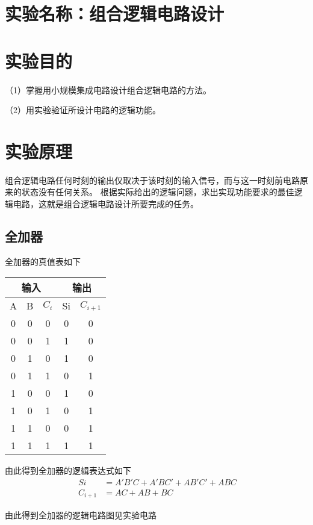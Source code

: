 \documentclass{article}
\begin{document}
	\section{ 实验名称：组合逻辑电路设计}
    \section{ 实验目的}
     （1）掌握用小规模集成电路设计组合逻辑电路的方法。\par 
               （2）用实验验证所设计电路的逻辑功能。\par 

   	\section{ 实验原理}
     组合逻辑电路任何时刻的输出仅取决于该时刻的输入信号，而与这一时刻前电路原来的状态没有任何关系。
     根据实际给出的逻辑问题，求出实现功能要求的最佳逻辑电路，这就是组合逻辑电路设计所要完成的任务。\par 
     \subsection{全加器}
     全加器的真值表如下
     \begin{table}[h]
      \centering  
      \begin{tabular}{c|c|c|c|c}
          \hline
          \multicolumn{3}{c}{输入} \vline  &  \multicolumn{2}{c}{输出} \vline     \\ \hline
                A             & B    &$C_i $   &  Si               & $ C_{i+1} $  \\ \hline
                0             & 0    &0        &   0               & 0            \\ \hline
                0             & 0    &1        &   1               & 0            \\ \hline
                0             & 1    &0        &   1               & 0            \\ \hline
                0             & 1    &1        &   0               & 1            \\ \hline
                1             & 0    &0        &   1               & 0            \\ \hline
                1             & 0    &1        &   0               & 1            \\ \hline
                1             & 1    &0        &   0               & 1            \\ \hline
                1             & 1    &1        &   1               & 1            \\ \hline
              \end{tabular}
    \end{table}
    \par
由此得到全加器的逻辑表达式如下
\begin{align*}
  \ Si&=A'B'C+A'BC'+AB'C'+ABC \\
  \ C_{i+1}&=AC+AB+BC
\end{align*}
\par
由此得到全加器的逻辑电路图见实验电路
\end{document}
